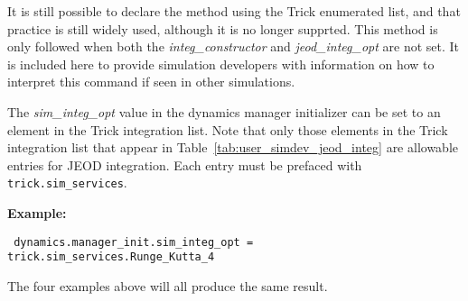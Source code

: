It is still possible to declare the method using the Trick enumerated list,
and that practice is still widely used, although it is no longer supprted.
This
method is only followed when both the \textit{integ\_constructor} and
\textit{jeod\_integ\_opt} are not set.  It is
included here to provide simulation developers with information on how to
interpret this command if seen in other simulations.

The \textit{sim\_integ\_opt} value in the dynamics manager initializer can be
set to an element in the Trick integration list.  Note that only those
elements in the Trick integration list that appear in
Table~\ref{tab:user_simdev_jeod_integ} are allowable entries for JEOD
integration.  Each entry must be prefaced with \verb+trick.sim_services+.

\textbf{Example:}
\begin{verbatim}
 dynamics.manager_init.sim_integ_opt = trick.sim_services.Runge_Kutta_4
\end{verbatim}

The four examples above will all produce the same result.



